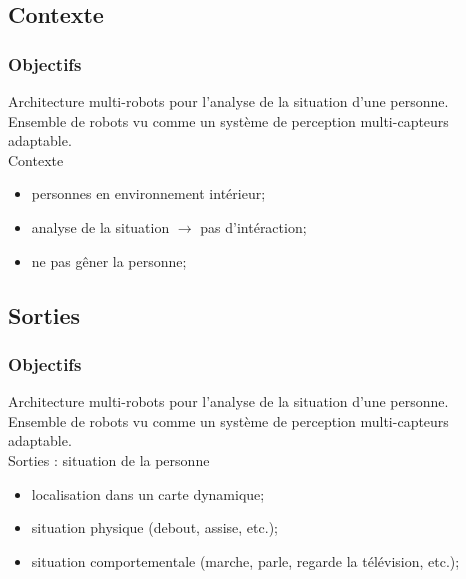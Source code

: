 \documentclass[usepdftitle=false, xcolor=dvipsnames, 12, c]{beamer} %
\begin{document}
\subsection{Contexte}
\begin{frame}[label=objContexte, t]
\frametitle{Objectifs}
    Architecture multi-robots pour l'analyse de la situation d'une personne.\\
    Ensemble de robots vu comme un système de perception multi-capteurs adaptable.\\
    \vspace{1em}
    Contexte
    \begin{itemize}
        \item[] personnes en environnement intérieur;
        \item[] analyse de la situation $\rightarrow$ pas d'intéraction;
        \item[] ne pas gêner la personne;
    \end{itemize}
\end{frame}

\setcounter{framenumber}{1}
\subsection{Sorties}
\begin{frame}[label=objSorties, t]
\frametitle{Objectifs}
    Architecture multi-robots pour l'analyse de la situation d'une personne.\\
    Ensemble de robots vu comme un système de perception multi-capteurs adaptable.\\
    \vspace{1em}
    Sorties : situation de la personne
    \begin{itemize}
        \item[] localisation dans un carte dynamique;
        \item[] situation physique (debout, assise, etc.);
        \item[] situation comportementale (marche, parle, regarde la télévision, etc.);
    \end{itemize}
\end{frame}

\setcounter{framenumber}{1}
\end{document}
